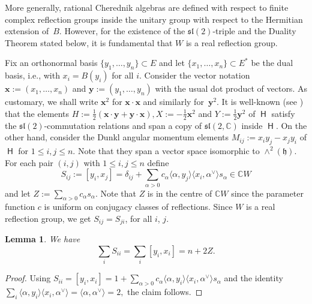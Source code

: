\documentclass[10pt,a4paper]{amsart}
\numberwithin{equation}{section}
\newtheorem{Lemma}[Theorem]{Lemma}
\newcommand{\fh}{\mathfrak{h}}
\newcommand{\fl}{\mathfrak{l}}
\newcommand{\fs}{\mathfrak{s}}
\newcommand{\bbc}{\mathbb{C}}
\newcommand{\bx}{\mathbf{x}}
\newcommand{\by}{\mathbf{y}}
\DeclareMathOperator{\rca}{\mathsf{H}}
\begin{document}
\begin{Remark}
More generally, rational Cherednik algebras are defined with respect to finite complex reflection groups inside the unitary group with respect to the Hermitian extension of~$B$. However, for the existence of the $\mathfrak{sl}(2)$-triple and the Duality Theorem stated below, it is fundamental that $W$ is a real reflection group.
\end{Remark}

Fix an orthonormal basis $\{y_1,\dots, y_n\}\subset E$ and let $\{x_1,\dots,x_n\}\subset E^*$ be the dual basis, i.e., with $x_i = B(y_i)$ for all $i$. Consider the vector notation $\bx:=(x_1,\dots,x_n)$ and $\by := (y_1,\dots,y_n)$ with the usual dot product of vectors. As customary, we shall write $\bx^2$ for $\bx\cdot\bx$ and similarly for~$\by^2$. It is well-known (see \cite{He91}) that the elements $H := \tfrac{1}{2}(\bx\cdot\by + \by\cdot\bx), X:= -\tfrac{1}{2}\bx^2$ and $Y:=\tfrac{1}{2} \by^2$ of $\rca$ satisfy the $\fs\fl(2)$-commutation relations and span a copy of $\fs\fl(2,\bbc)$ inside $\rca$. On the other hand, consider the Dunkl angular momentum elements $M_{ij} := x_iy_j - x_jy_i$ of $\rca$ for $1\leq i,j\leq n$. Note that they span a vector space isomorphic to $\wedge^2(\fh)$. For each pair $(i,j)$ with $1\leq i, j\leq n$ define
\[
S_{ij} := [y_i,x_j] = \delta_{ij} + \sum_{\alpha >0} c_\alpha \langle \alpha,y_j \rangle \langle x_i, \alpha^\vee \rangle s_\alpha\in\bbc W
\]
and let $Z := \sum_{\alpha>0} c_\alpha s_\alpha$. Note that $Z$ is in the centre of $\bbc W$ since the parameter function $c$ is uniform on conjugacy classes of reflections. Since $W$ is a real reflection group, we get $S_{ij}=S_{ji}$, for all $i$, $j$.

\begin{Lemma}
We have
\begin{equation}\label{e:commutatorsum}
 \sum_i S_{ii} = \sum_i [y_i,x_i] = n + 2Z.
\end{equation}
\end{Lemma}

\begin{proof}
Using $S_{ii} = [y_i,x_i] = 1+\sum_{\alpha >0} c_\alpha \langle \alpha ,y_i\rangle \langle x_i,\alpha^\vee \rangle s_\alpha$ and the identity
$
\sum_i \langle \alpha,y_i \rangle \langle x_i,\alpha^\vee \rangle = \langle \alpha, \alpha^\vee\rangle =2,
$
the claim follows.
\end{proof}
\end{document}
